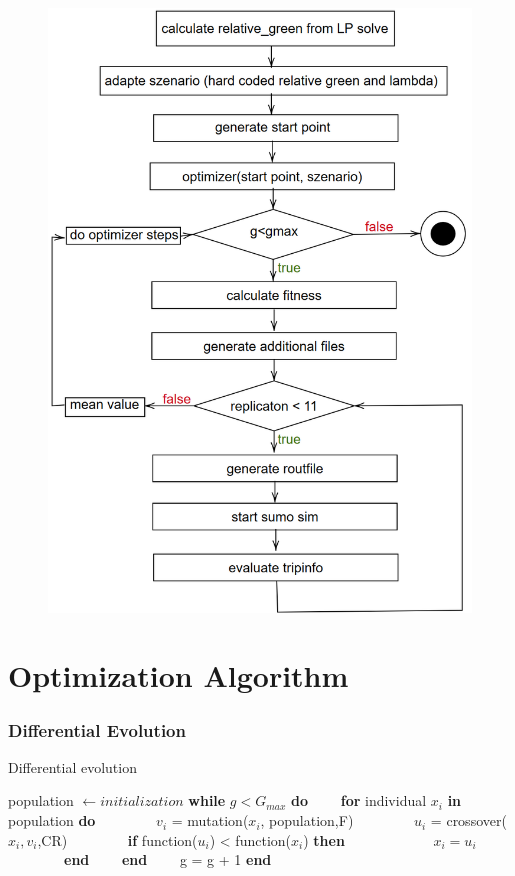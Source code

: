\documentclass{beamer}
\begin{document}
	\begin{frame}
		\begin{figure}[H]
			\centering
			\includegraphics[width=0.45\linewidth]{diagram-202001222}
			\label{fig:diagram-202001222}
		\end{figure}
	\end{frame}

	\section{Optimization Algorithm}
	\frame{\tableofcontents[currentsection]}

	\begin{frame}
	\frametitle{Differential Evolution}
	\begin{algorithm}[H]{Differential evolution}
		\begin{algorithmic}[1]
			\State population $\leftarrow initialization$
			\State \textbf{while} $g<G_{max}$ \textbf{do}
			\State \ \ \ \ \textbf{for} individual $x_{i}$ \textbf{in} population \textbf{do}
			\State \ \ \ \ \ \ \ \ $v_{i}$ = mutation($x_{i}$, population,F)
			\State \ \ \ \ \ \ \ \ $u_{i}$ = crossover($x_{i},v_{i}$,CR)
			\State \ \ \ \ \ \ \ \ \textbf{if} function($u_{i}$) < function($x_{i}$) \textbf{then}
			\State \ \ \ \ \ \ \ \ \ \ \ \ $x_{i} = u_{i}$
			\State \ \ \ \ \ \ \ \ \textbf{end}
			\State \ \ \ \ \textbf{end}
			\State \ \ \ \ g = g + 1
			\State \textbf{end}
		\end{algorithmic}
	\end{algorithm}
		
	\end{frame}
\end{document}

